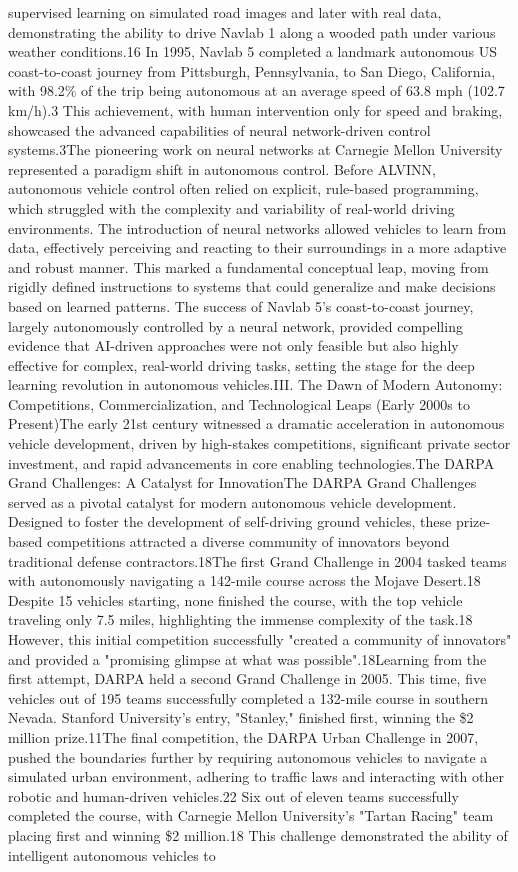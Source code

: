 supervised learning on simulated road images and later with real data, demonstrating the ability to drive Navlab 1 along a wooded path under various weather conditions.16 In 1995, Navlab 5 completed a landmark autonomous US coast-to-coast journey from Pittsburgh, Pennsylvania, to San Diego, California, with 98.2\% of the trip being autonomous at an average speed of 63.8 mph (102.7 km/h).3 This achievement, with human intervention only for speed and braking, showcased the advanced capabilities of neural network-driven control systems.3The pioneering work on neural networks at Carnegie Mellon University represented a paradigm shift in autonomous control. Before ALVINN, autonomous vehicle control often relied on explicit, rule-based programming, which struggled with the complexity and variability of real-world driving environments. The introduction of neural networks allowed vehicles to learn from data, effectively perceiving and reacting to their surroundings in a more adaptive and robust manner. This marked a fundamental conceptual leap, moving from rigidly defined instructions to systems that could generalize and make decisions based on learned patterns. The success of Navlab 5's coast-to-coast journey, largely autonomously controlled by a neural network, provided compelling evidence that AI-driven approaches were not only feasible but also highly effective for complex, real-world driving tasks, setting the stage for the deep learning revolution in autonomous vehicles.III. The Dawn of Modern Autonomy: Competitions, Commercialization, and Technological Leaps (Early 2000s to Present)The early 21st century witnessed a dramatic acceleration in autonomous vehicle development, driven by high-stakes competitions, significant private sector investment, and rapid advancements in core enabling technologies.The DARPA Grand Challenges: A Catalyst for InnovationThe DARPA Grand Challenges served as a pivotal catalyst for modern autonomous vehicle development. Designed to foster the development of self-driving ground vehicles, these prize-based competitions attracted a diverse community of innovators beyond traditional defense contractors.18The first Grand Challenge in 2004 tasked teams with autonomously navigating a 142-mile course across the Mojave Desert.18 Despite 15 vehicles starting, none finished the course, with the top vehicle traveling only 7.5 miles, highlighting the immense complexity of the task.18 However, this initial competition successfully "created a community of innovators" and provided a "promising glimpse at what was possible".18Learning from the first attempt, DARPA held a second Grand Challenge in 2005. This time, five vehicles out of 195 teams successfully completed a 132-mile course in southern Nevada. Stanford University's entry, "Stanley," finished first, winning the \$2 million prize.11The final competition, the DARPA Urban Challenge in 2007, pushed the boundaries further by requiring autonomous vehicles to navigate a simulated urban environment, adhering to traffic laws and interacting with other robotic and human-driven vehicles.22 Six out of eleven teams successfully completed the course, with Carnegie Mellon University's "Tartan Racing" team placing first and winning \$2 million.18 This challenge demonstrated the ability of intelligent autonomous vehicles to 